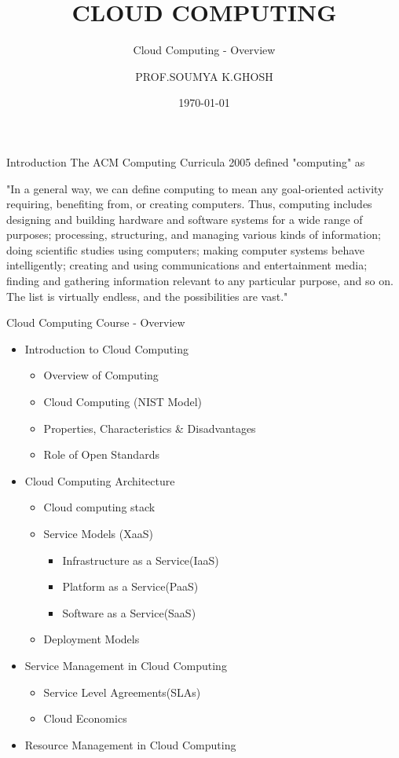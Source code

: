 \documentclass{SKP-beamer}
\title[Cloud Computing]{CLOUD COMPUTING}
\subtitle{Cloud Computing - Overview}
\author{PROF.SOUMYA K.GHOSH}
\institute[IIT,KGP]{
  DEPARTMENT OF COMPUTER SCIENCE AND ENGINEERING IIT KHARAGPUR
}
\date{\today}
\begin{document}
\begin{frame}
  \titlepage
\end{frame}

\begin{frame}{Introduction}
  The ACM Computing Curricula 2005 defined "computing" as
  
  "In a general way, we can define computing to mean any goal-oriented activity  requiring,  benefiting  from,  or  creating  computers.  Thus, computing includes designing and building hardware and software systems for a wide range of purposes; processing, structuring, and managing various kinds of information; doing scientific studies using computers; making computer systems behave intelligently; creating and  using  communications  and  entertainment  media;  finding  and gathering information relevant to any particular purpose, and so on. The list is virtually endless, and the possibilities are vast."
  
\end{frame}



\begin{frame}{Cloud Computing Course - Overview}
	\begin{itemize}
		\item  Introduction to Cloud Computing
		\begin{itemize}
			\item  Overview of Computing
			\item Cloud Computing (NIST Model)
			\item Properties, Characteristics \& Disadvantages
			\item Role of Open Standards
			
		\end{itemize}
		\item Cloud Computing Architecture
			\begin{itemize}
			\item  Cloud computing stack
            \item  Service Models (XaaS)
		        \begin{itemize}
		        	\item  Infrastructure as a Service(IaaS)
		        	\item  Platform as a Service(PaaS)
		        	\item Software as a Service(SaaS)
		        \end{itemize}
			\item  Deployment Models
	    	\end{itemize}
		\item Service Management in Cloud Computing
		        	\begin{itemize}
		        	\item  Service Level Agreements(SLAs)
		        	\item  Cloud Economics
		        	 \end{itemize}
		 \item Resource Management in Cloud 
		 Computing
		 
	\end{itemize}
\end{frame}
\end{document}
